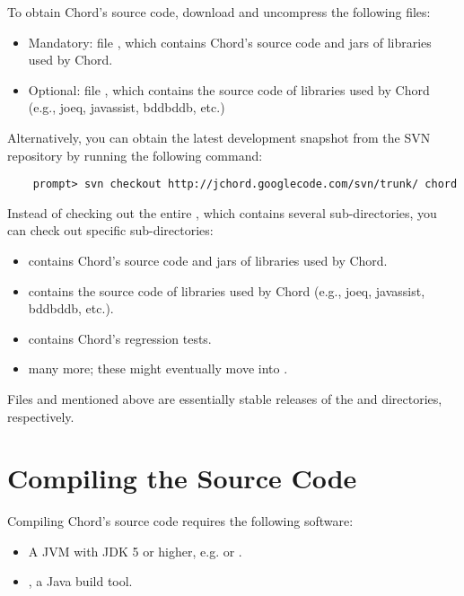 To obtain Chord's source code, download and uncompress the following
files:

\begin{itemize}
\item
Mandatory: file
,
which contains Chord's source code and jars of libraries used by
Chord.
\item
Optional: file
,
which contains the source code of libraries used by Chord (e.g., joeq,
javassist, bddbddb, etc.)
\end{itemize}

Alternatively, you can obtain the latest development snapshot from the
SVN repository by running the following command:

\begin{verbatim}
    prompt> svn checkout http://jchord.googlecode.com/svn/trunk/ chord
\end{verbatim}

Instead of checking out the entire , which contains
several sub-directories, you can check out specific sub-directories:

\begin{itemize}
\item
{} contains Chord's source code and jars of libraries used by Chord.
\item
{} contains the source code of libraries used by Chord
(e.g., joeq, javassist, bddbddb, etc.).
\item
{} contains Chord's regression tests.
\item
many more; these might eventually move into .
\end{itemize}

Files  and 
mentioned above are essentially stable releases of the 
and  directories, respectively.

\section{Compiling the Source Code}
\label{sec:compiling-sources}

Compiling Chord's source code requires the following software:

\begin{itemize}
\item
A JVM with JDK 5 or higher, e.g.
 or
.
\item
{}, a Java build tool.
\end{itemize}


